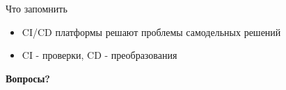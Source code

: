 \documentclass[aspectratio=169]{beamer}
\begin{document}
    \begin{frame}{Что запомнить}
        \begin{itemize}
            \item CI/CD платформы решают проблемы самодельных решений
            \item CI - проверки, CD - преобразования
        \end{itemize}

        \vspace{0.5cm}

        \begin{center}
            \textbf{Вопросы?}
        \end{center}
    \end{frame}
\end{document}
